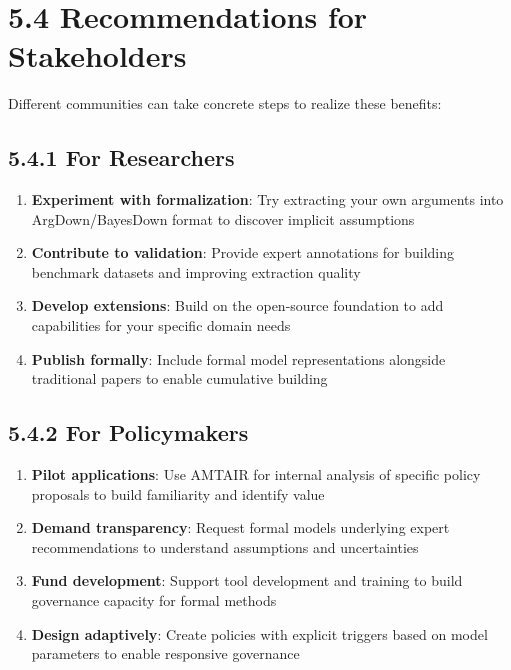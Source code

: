 \documentclass[
  11pt,
  letterpaper,
  openany]{book}
\providecommand{\tightlist}{%
  \setlength{\itemsep}{0pt}\setlength{\parskip}{0pt}}
\begin{document}
\section{5.4 Recommendations for
Stakeholders}\label{sec-recommendations}

Different communities can take concrete steps to realize these benefits:

\subsection{5.4.1 For Researchers}\label{sec-researcher-recommendations}

\begin{enumerate}
\def\labelenumi{\arabic{enumi}.}
\tightlist
\item
  \textbf{Experiment with formalization}: Try extracting your own
  arguments into ArgDown/BayesDown format to discover implicit
  assumptions
\item
  \textbf{Contribute to validation}: Provide expert annotations for
  building benchmark datasets and improving extraction quality
\item
  \textbf{Develop extensions}: Build on the open-source foundation to
  add capabilities for your specific domain needs
\item
  \textbf{Publish formally}: Include formal model representations
  alongside traditional papers to enable cumulative building
\end{enumerate}

\subsection{5.4.2 For
Policymakers}\label{sec-policymaker-recommendations}

\begin{enumerate}
\def\labelenumi{\arabic{enumi}.}
\tightlist
\item
  \textbf{Pilot applications}: Use AMTAIR for internal analysis of
  specific policy proposals to build familiarity and identify value
\item
  \textbf{Demand transparency}: Request formal models underlying expert
  recommendations to understand assumptions and uncertainties
\item
  \textbf{Fund development}: Support tool development and training to
  build governance capacity for formal methods
\item
  \textbf{Design adaptively}: Create policies with explicit triggers
  based on model parameters to enable responsive governance
\end{enumerate}
\end{document}
